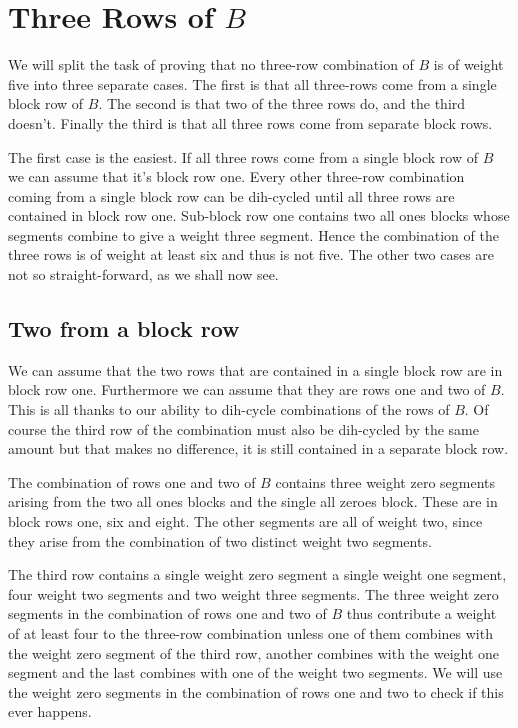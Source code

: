 \section{Three Rows of $B$}
We will split the task of proving that no three-row combination of $B$ is of weight five into three separate cases.
The first is that all three-rows come from a single block row of $B$.
The second is that two of the three rows do, and the third doesn't.
Finally the third is that all three rows come from separate block rows.

The first case is the easiest.
If all three rows come from a single block row of $B$ we can assume that it's block row one.
Every other three-row combination coming from a single block row can be dih-cycled until all three rows are contained in block row one.
Sub-block row one contains two all ones blocks whose segments combine to give a weight three segment.
Hence the combination of the three rows is of weight at least six and thus is not five.
The other two cases are not so straight-forward, as we shall now see.

\subsection{Two from a block row}
We can assume that the two rows that are contained in a single block row are in block row one.
Furthermore we can assume that they are rows one and two of $B$.
This is all thanks to our ability to dih-cycle combinations of the rows of $B$.
Of course the third row of the combination must also be dih-cycled by the same amount but that makes no difference, it is still contained in a separate block row.

The combination of rows one and two of $B$ contains three weight zero segments arising from the two all ones blocks and the single all zeroes block.
These are in block rows one, six and eight.
The other segments are all of weight two, since they arise from the combination of two distinct weight two segments.

The third row contains a single weight zero segment a single weight one segment, four weight two segments and two weight three segments.
The three weight zero segments in the combination of rows one and two of $B$ thus contribute a weight of at least four to the three-row combination unless one of them combines with the weight zero segment of the third row, another combines with the weight one segment and the last combines with one of the weight two segments.
We will use the weight zero segments in the combination of rows one and two to check if this ever happens.

